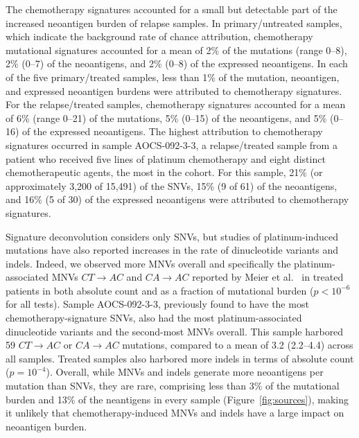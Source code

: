 The chemotherapy signatures accounted for a small but detectable part of the increased neoantigen burden of relapse samples. In primary/untreated samples, which indicate the background rate of chance attribution, chemotherapy mutational signatures accounted for a mean of 2\% of the mutations (range 0--8), 2\% (0--7) of the neoantigens, and 2\% (0--8) of the expressed neoantigens. In each of the five primary/treated samples, less than 1\% of the mutation, neoantigen, and expressed neoantigen burdens were attributed to chemotherapy signatures. For the relapse/treated samples, chemotherapy signatures accounted for a mean of 6\% (range 0--21) of the mutations, 5\% (0--15) of the neoantigens, and 5\% (0--16) of the expressed neoantigens. The highest attribution to chemotherapy signatures occurred in sample AOCS-092-3-3, a relapse/treated sample from a patient who received five lines of platinum chemotherapy and eight distinct chemotherapeutic agents, the most in the cohort. For this sample, 21\% (or approximately 3,200 of 15,491) of the SNVs, 15\% (9 of 61) of the neoantigens, and 16\% (5 of 30) of the expressed neoantigens were attributed to chemotherapy signatures.

Signature deconvolution considers only SNVs, but studies of platinum-induced mutations have also reported increases in the rate of dinucleotide variants and indels. Indeed, we observed more MNVs overall and specifically the platinum-associated MNVs $CT \rightarrow AC$ and $CA \rightarrow AC$ reported by Meier et al.~\cite{Meier_2014} in treated patients in both absolute count and as a fraction of mutational burden ($p < 10^{-6}$ for all tests). Sample AOCS-092-3-3, previously found to have the most chemotherapy-signature SNVs, also had the most platinum-associated dinucleotide variants and the second-most MNVs overall. This sample harbored 59 $CT \rightarrow AC$ or $CA \rightarrow AC$ mutations, compared to a mean of 3.2 (2.2--4.4) across all samples. Treated samples also harbored more indels in terms of absolute count ($p=10^{-4}$). Overall, while MNVs and indels generate more neoantigens per mutation than SNVs, they are rare, comprising less than 3\% of the mutational burden and 13\% of the neantigens in every sample (Figure~\ref{fig:sources}), making it unlikely that chemotherapy-induced MNVs and indels have a large impact on neoantigen burden.


